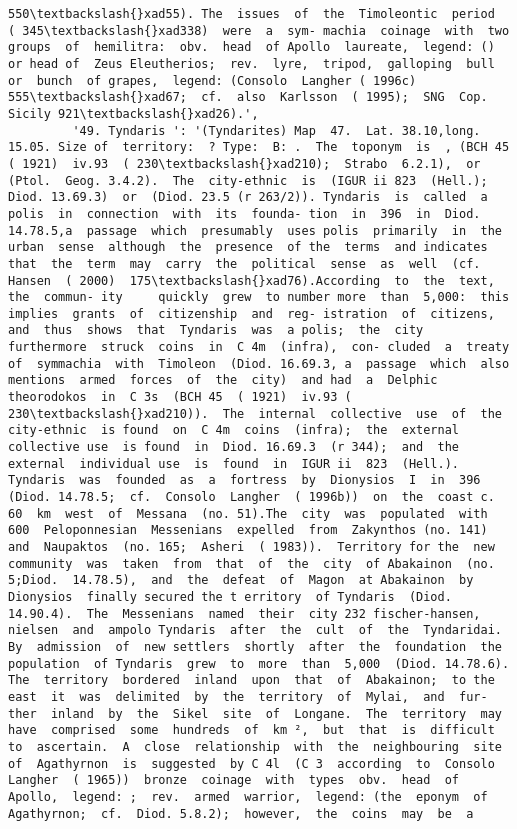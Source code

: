 \documentclass[11pt]{article}
\begin{document}
\begin{Verbatim}[commandchars=\\\{\}]
550\textbackslash{}xad55). The  issues  of  the  Timoleontic  period  ( 345\textbackslash{}xad338)  were  a  sym- machia  coinage  with  two  groups  of  hemilitra:  obv.  head  of Apollo  laureate,  legend: () or head of  Zeus Eleutherios;  rev.  lyre,  tripod,  galloping  bull  or  bunch  of grapes,  legend: (Consolo  Langher ( 1996c)  555\textbackslash{}xad67;  cf.  also  Karlsson  ( 1995);  SNG  Cop.  Sicily 921\textbackslash{}xad26).',
         '49. Tyndaris ': '(Tyndarites) Map  47.  Lat. 38.10,long.  15.05. Size of  territory:  ? Type:  B: .  The  toponym  is  , (BCH 45  ( 1921)  iv.93  ( 230\textbackslash{}xad210);  Strabo  6.2.1),  or   (Ptol.  Geog. 3.4.2).  The  city-ethnic  is  (IGUR ii 823  (Hell.);  Diod. 13.69.3)  or  (Diod. 23.5 (r 263/2)). Tyndaris  is  called  a  polis  in  connection  with  its  founda- tion  in  396  in  Diod. 14.78.5,a  passage  which  presumably  uses polis  primarily  in  the  urban  sense  although  the  presence  of the  terms  and indicates that  the  term  may  carry  the  political  sense  as  well  (cf. Hansen  ( 2000)  175\textbackslash{}xad76).According  to  the  text,  the  commun- ity     quickly  grew  to number more  than  5,000:  this  implies  grants  of  citizenship  and  reg- istration  of  citizens,  and  thus  shows  that  Tyndaris  was  a polis;  the  city  furthermore  struck  coins  in  C 4m  (infra),  con- cluded  a  treaty  of  symmachia  with  Timoleon  (Diod. 16.69.3, a  passage  which  also  mentions  armed  forces  of  the  city)  and had  a  Delphic  theorodokos  in  C 3s  (BCH 45  ( 1921)  iv.93 ( 230\textbackslash{}xad210)).  The  internal  collective  use  of  the  city-ethnic  is found  on  C 4m  coins  (infra);  the  external  collective use  is found  in  Diod. 16.69.3  (r 344);  and  the  external  individual use  is  found  in  IGUR ii  823  (Hell.). Tyndaris  was  founded  as  a  fortress  by  Dionysios  I  in  396 (Diod. 14.78.5;  cf.  Consolo  Langher  ( 1996b))  on  the  coast c. 60  km  west  of  Messana  (no. 51).The  city  was  populated  with 600  Peloponnesian  Messenians  expelled  from  Zakynthos (no. 141)  and  Naupaktos  (no. 165;  Asheri  ( 1983)).  Territory for the  new  community  was  taken  from  that  of  the  city  of Abakainon  (no. 5;Diod.  14.78.5),  and  the  defeat  of  Magon  at Abakainon  by  Dionysios  finally secured the t erritory  of Tyndaris  (Diod. 14.90.4).  The  Messenians  named  their  city 232 fischer-hansen,  nielsen  and  ampolo Tyndaris  after  the  cult  of  the  Tyndaridai.  By  admission  of  new settlers  shortly  after  the  foundation  the  population  of Tyndaris  grew  to  more  than  5,000  (Diod. 14.78.6). The  territory  bordered  inland  upon  that  of  Abakainon;  to the  east  it  was  delimited  by  the  territory  of  Mylai,  and  fur- ther  inland  by  the  Sikel  site  of  Longane.  The  territory  may have  comprised  some  hundreds  of  km ²,  but  that  is  difficult to  ascertain.  A  close  relationship  with  the  neighbouring  site of  Agathyrnon  is  suggested  by C 4l  (C 3  according  to  Consolo Langher  ( 1965))  bronze  coinage  with  types  obv.  head  of Apollo,  legend: ;  rev.  armed  warrior,  legend: (the  eponym  of  Agathyrnon;  cf.  Diod. 5.8.2);  however,  the  coins  may  be  a  
\end{Verbatim}
\end{document}
